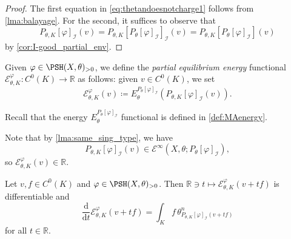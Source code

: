 \begin{proof}
The first equation in \eqref{eq:thetandoesnotcharge1} follows from \cref{lma:balayage}. For the second, it suffices to observe that
\[
P_{\theta,K}[\varphi]_{\mathcal{I}}(v)=P_{\theta,K}\left[P_{\theta}[\varphi]_{\mathcal{I}}\right]_{\mathcal{I}}(v)=P_{\theta,K}\left[P_{\theta}[\varphi]_{\mathcal{I}}\right](v)
\]
by \cref{cor:I-good_partial_env}.
\end{proof}


\begin{definition}\label{def:partialequienergy}
Given $\varphi\in \PSH(X,\theta)_{>0}$, we define the \emph{partial equilibrium energy} functional $\mathcal{E}_{\theta,K}^{\varphi}\colon C^0(K)\rightarrow \mathbb{R}$ as follows: given $v \in C^0(K)$, we set
\begin{equation}
\mathcal{E}_{\theta,K}^{\varphi}(v)\coloneqq E_{\theta}^{P_{\theta}[\varphi]_{\mathcal{I}}}\left(P_{\theta,K}[\varphi]_{\mathcal{I}}(v)\right).
\end{equation}
\end{definition}
Recall that the energy $E_{\theta}^{P_{\theta}[\varphi]_{\mathcal{I}}}$ functional is defined in \cref{def:MAenergy}.

Note that by \cref{lma:same_sing_type}, we have
\[
P_{\theta,K}[\varphi]_{\mathcal{I}}(v)\in \mathcal{E}^{\infty}\left(X,\theta;P_{\theta}[\varphi]_{\mathcal{I}}\right),
\]
so $\mathcal{E}_{\theta,K}^{\varphi}(v)\in \mathbb{R}$.


\begin{proposition}\label{prop:differential_P} Let $v,f \in C^0(K)$ and $\varphi \in \PSH(X,\theta)_{>0}$.
Then $\mathbb{R}\ni t \mapsto \mathcal{E}_{\theta,K}^{\varphi}(v+tf)$ is differentiable and
\begin{equation}\label{eq:ddtI}
\frac{\mathrm{d}}{\mathrm{d}t}\mathcal{E}_{\theta,K}^{\varphi}(v+tf) = \int_K f\, \theta^n_{P_{\theta,K}[\varphi]_{\mathcal{I}}(v+tf)}
\end{equation}
for all $t\in \mathbb{R}$.
\end{proposition}

